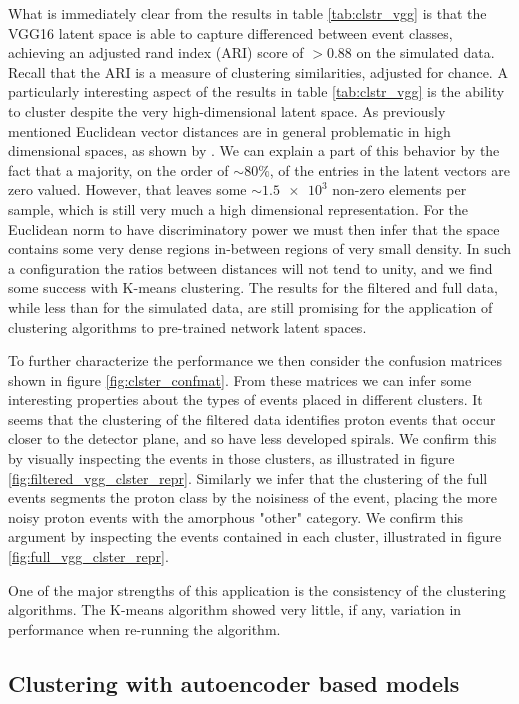 What is immediately clear from the results in table \ref{tab:clstr_vgg} is that the VGG16 latent space is able to capture differenced between event classes, achieving an adjusted rand index (ARI) score of $>0.88$ on the simulated data. Recall that the ARI is a measure of clustering similarities, adjusted for chance. A particularly interesting aspect of the results in  table \ref{tab:clstr_vgg} is the ability to cluster despite the very high-dimensional latent space. As previously mentioned Euclidean vector distances are in general problematic in high dimensional spaces, as shown by \cite{Aggarwal}. We can explain a part of this behavior by the fact that a majority, on the order of $\sim 80\%$, of the entries in the latent vectors are zero valued. However, that leaves some $\sim \num{1.5e3}$ non-zero elements per sample, which is still very much a high dimensional representation. For the Euclidean norm to have discriminatory power we must then infer that the space contains some very dense regions in-between regions of very small density. In such a configuration the ratios between distances will not tend to unity, and we find some success with K-means clustering. The results for the filtered and full data, while less than for the simulated data, are still promising for the application of clustering algorithms to pre-trained network latent spaces.

To further characterize the performance we then consider the confusion matrices shown in figure \ref{fig:clster_confmat}. From these matrices we can infer some interesting properties about the types of events placed in different clusters. It seems that the clustering of the filtered data identifies proton events that occur closer to the detector plane, and so have less developed spirals. We confirm this by visually inspecting the events in those clusters, as illustrated in figure \ref{fig:filtered_vgg_clster_repr}. Similarly we infer that the clustering of the full events segments the proton class by the noisiness of the event, placing the more noisy proton events with the amorphous "other" category. We confirm this argument by inspecting the events contained in each cluster, illustrated in figure \ref{fig:full_vgg_clster_repr}.

One of the major strengths of this application is the consistency of the clustering algorithms. The K-means algorithm showed very little, if any, variation in performance when re-running the algorithm. 

\subsection{Clustering with autoencoder based models}

